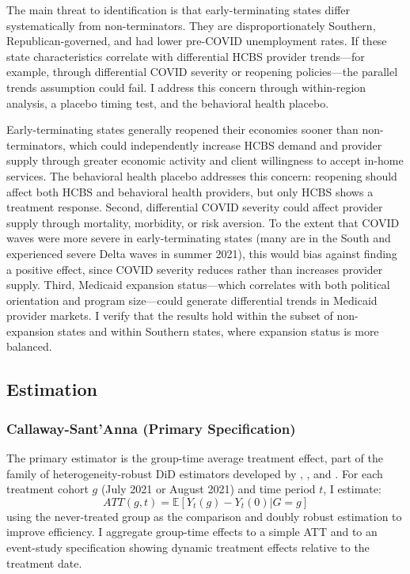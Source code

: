 \documentclass[12pt]{article}
\newcommand{\E}{\mathbb{E}}
\begin{document}
The main threat to identification is that early-terminating states differ systematically from non-terminators. They are disproportionately Southern, Republican-governed, and had lower pre-COVID unemployment rates. If these state characteristics correlate with differential HCBS provider trends---for example, through differential COVID severity or reopening policies---the parallel trends assumption could fail. I address this concern through within-region analysis, a placebo timing test, and the behavioral health placebo.

Early-terminating states generally reopened their economies sooner than non-terminators, which could independently increase HCBS demand and provider supply through greater economic activity and client willingness to accept in-home services. The behavioral health placebo addresses this concern: reopening should affect both HCBS and behavioral health providers, but only HCBS shows a treatment response. Second, differential COVID severity could affect provider supply through mortality, morbidity, or risk aversion. To the extent that COVID waves were more severe in early-terminating states (many are in the South and experienced severe Delta waves in summer 2021), this would bias against finding a positive effect, since COVID severity reduces rather than increases provider supply. Third, Medicaid expansion status---which correlates with both political orientation and program size---could generate differential trends in Medicaid provider markets. I verify that the results hold within the subset of non-expansion states and within Southern states, where expansion status is more balanced.

\subsection{Estimation}

\subsubsection{Callaway-Sant'Anna (Primary Specification)}

The primary estimator is the \citet{callaway2021} group-time average treatment effect, part of the family of heterogeneity-robust DiD estimators developed by \citet{dechaisemartin2020}, \citet{sun2021}, and \citet{borusyak2024}. For each treatment cohort $g$ (July 2021 or August 2021) and time period $t$, I estimate:
\begin{equation}
ATT(g,t) = \E[Y_t(g) - Y_t(0) | G = g]
\end{equation}
using the never-treated group as the comparison and doubly robust estimation to improve efficiency. I aggregate group-time effects to a simple ATT and to an event-study specification showing dynamic treatment effects relative to the treatment date.
\end{document}
